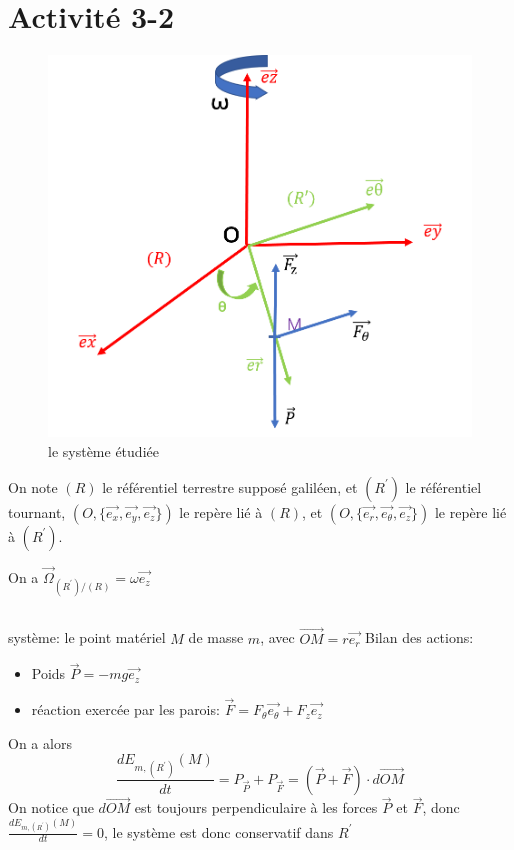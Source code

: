 \documentclass[a4paper,12pt]{book}
\begin{document}
\renewcommand{\labelitemi}{$\blacktriangleright$}
\renewcommand{\labelitemii}{$\bullet$}


\section{Activité 3-2}
\begin{figure}[h]
    \begin{center}
    \includegraphics[scale=0.6]{meca41.png}
    \end{center}
    \caption{le système étudiée}
\end{figure}
On note $(R)$ le référentiel terrestre supposé galiléen, et $(R^{'})$ le référentiel tournant, 
$(O,\{\vec{e_x},\vec{e_y},\vec{e_z}\})$ le repère lié à $(R)$, et $(O,\{\vec{e_r},\vec{e_\theta},\vec{e_z}\})$ 
le repère lié à $(R^{'})$. 

On a $\vec{\Omega}_{(R^{'})/(R)}=\omega\vec{e_z}$
\subsection{}
système: le point matériel $M$ de masse $m$, avec $\overrightarrow{OM}=r\vec{e_r}$
Bilan des actions: 
\begin{itemize}
    \item Poids $\vec{P}=-mg\vec{e_z}$
    \item réaction exercée par les parois: $\vec{F}=F_\theta\vec{e_\theta}+F_z\vec{e_z}$
\end{itemize}
On a alors 
$$
\frac{dE_{m,(R^{'})}(M)}{dt}=P_{\vec{P}}+P_{\vec{F}}=(\vec{P}+\vec{F})\cdot d\overrightarrow{OM}
$$
On notice que $d\overrightarrow{OM}$ est toujours perpendiculaire à les forces $\vec{P}$ et $\vec{F}$, 
donc $\boxed{\frac{dE_{m,(R^{'})}(M)}{dt}=0}$, le système est donc conservatif dans $R^{'}$
\end{document}
